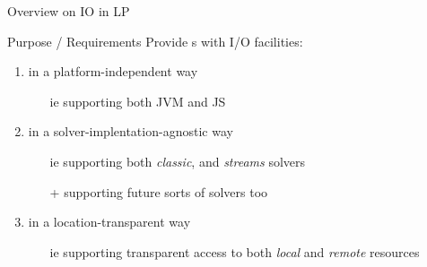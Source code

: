 \documentclass[handout]{beamer}
\begin{document}
\begin{frame}[allowframebreaks]{Overview on IO in LP}

    \begin{block}{Purpose / Requirements}
        Provide s with I/O facilities:
        \begin{enumerate}
            \item\label{iolib:platform-independence} in a \alert{platform-independent} way
            \begin{itemize}
                \item[ie] supporting both JVM and JS 
            \end{itemize}

            \item\label{iolib:solver-agnosticism} in a \alert{solver-implentation-agnostic} way
            \begin{itemize}
                \item[ie] supporting both \emph{classic}, and \emph{streams} solvers
                \item[+] supporting future sorts of solvers too
            \end{itemize}

            \item\label{iolib:location-transparency} in a \alert{location-transparent} way
            \begin{itemize}
                \item[ie] supporting transparent access to both \emph{local} and \emph{remote} resources
            \end{itemize}
        \end{enumerate}
    \end{block}

    \framebreak


\end{frame}
\end{document}
